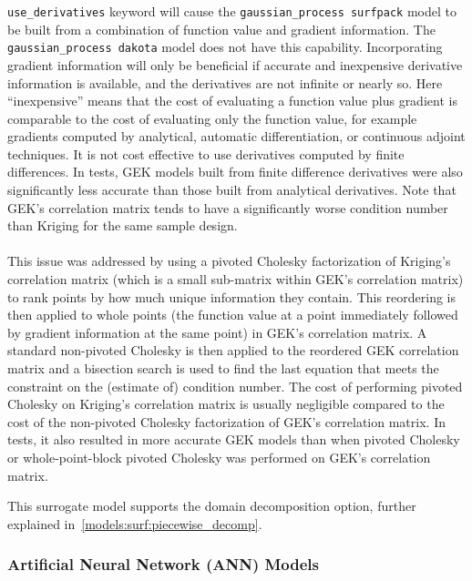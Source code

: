 \begin{itemize}
      \texttt{use\_derivatives}  keyword will cause the 
      \texttt{gaussian\_process surfpack} model to be built from a 
      combination of function value and gradient information.  The 
      \texttt{gaussian\_process dakota} model does not have this 
      capability.  Incorporating gradient information will only be 
      beneficial if accurate and inexpensive derivative information is 
      available, and the derivatives are not infinite or nearly so.  Here 
      ``inexpensive'' means that the cost of evaluating a function value 
      plus gradient is comparable to the cost of evaluating only the 
      function value, for example gradients computed by analytical, 
      automatic differentiation, or continuous adjoint techniques. It is 
      not cost effective to use derivatives computed by finite differences.
      In tests, GEK models built from finite difference derivatives were 
      also significantly less accurate than those built from analytical 
      derivatives.  Note that GEK's correlation matrix tends to have a 
      significantly worse condition number than Kriging for the same 
      sample design.\\ \\
      This issue was addressed by using a pivoted Cholesky 
      factorization of Kriging's correlation matrix (which is a small 
      sub-matrix within GEK's correlation matrix) to rank points by how 
      much unique information they contain. This reordering is then 
      applied to whole points (the function value at a point immediately 
      followed by gradient information at the same point) in GEK's 
      correlation matrix.  A standard non-pivoted Cholesky is then 
      applied to the reordered GEK correlation matrix and a bisection 
      search is used to find the last equation that meets the constraint on 
      the (estimate of) condition number. The cost of performing pivoted
      Cholesky on Kriging's correlation matrix is usually negligible 
      compared to the cost of the non-pivoted Cholesky factorization of 
      GEK's correlation matrix.  In tests, it also resulted in more
      accurate GEK models than when pivoted Cholesky or 
      whole-point-block pivoted Cholesky was performed on GEK's 
      correlation matrix.
\end{itemize}

This surrogate model supports the domain decomposition option, further explained in~\ref{models:surf:piecewise_decomp}.

\subsubsection{Artificial Neural Network (ANN) Models}\label{models:surf:ann}

